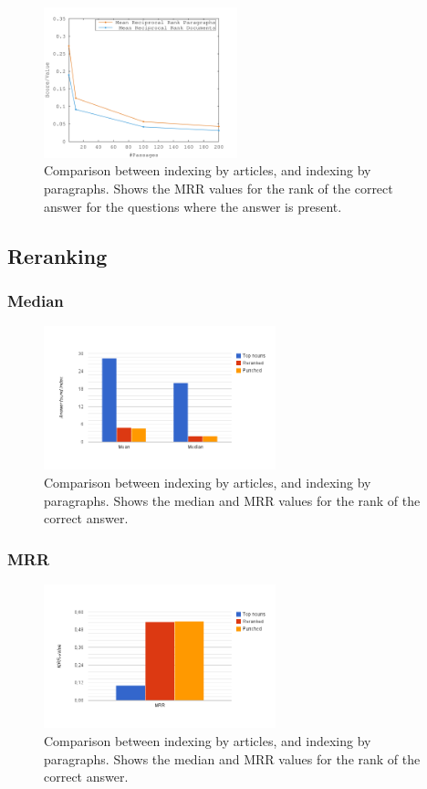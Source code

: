 \begin{figure}[h!]
  \centering
  \includegraphics[width=0.5\textwidth]{figures/median.pdf}
  \caption{Comparison between indexing by articles, and indexing by paragraphs. 
  Shows the MRR values for the rank of the correct answer for the questions where 
  the answer is present.}
\end{figure}

\subsection{Reranking}

\subsubsection{Median}


\begin{figure}[h!]
  \centering
  \hspace*{-0.6cm}
  \includegraphics[width=0.6\textwidth]{figures/meanMedian.png}
  \caption{Comparison between indexing by articles, and indexing by paragraphs. 
  Shows the median and MRR values for the rank of the correct answer.}
\end{figure}

\subsubsection{MRR}


\begin{figure}[h!]
  \centering
  \hspace*{-0.6cm}
  \includegraphics[width=0.6\textwidth]{figures/mrr.png}
  \caption{Comparison between indexing by articles, and indexing by paragraphs. 
  Shows the median and MRR values for the rank of the correct answer.}
\end{figure}
